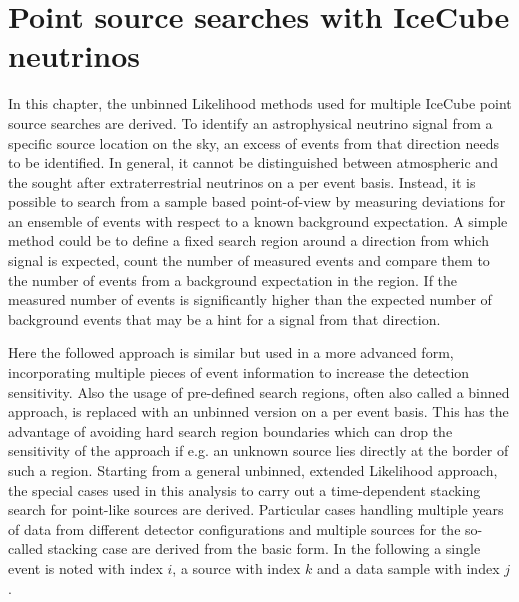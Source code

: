 \chapter{Point source searches with IceCube neutrinos}
  \label{chp:pointsource}
In this chapter, the unbinned Likelihood methods used for multiple IceCube point source searches are derived.
To identify an astrophysical neutrino signal from a specific source location on the sky, an excess of events from that direction needs to be identified.
In general, it cannot be distinguished between atmospheric and the sought after extraterrestrial neutrinos on a per event basis.
Instead, it is possible to search from a sample based point-of-view by measuring deviations for an ensemble of events with respect to a known background expectation.
A simple method could be to define a fixed search region around a direction from which signal is expected, count the number of measured events and compare them to the number of events from a background expectation in the region.
If the measured number of events is significantly higher than the expected number of background events that may be a hint for a signal from that direction.

Here the followed approach is similar but used in a more advanced form, incorporating multiple pieces of event information to increase the detection sensitivity.
Also the usage of pre-defined search regions, often also called a binned approach, is replaced with an unbinned version on a per event basis.
This has the advantage of avoiding hard search region boundaries which can drop the sensitivity of the approach if e.g. an unknown source lies directly at the border of such a region.
Starting from a general unbinned, extended Likelihood approach, the special cases used in this analysis to carry out a time-dependent stacking search for point-like sources are derived.
Particular cases handling multiple years of data from different detector configurations and multiple sources for the so-called stacking case are derived from the basic form.
In the following a single event is noted with index $i$, a source with index $k$ and a data sample with index $j$.

